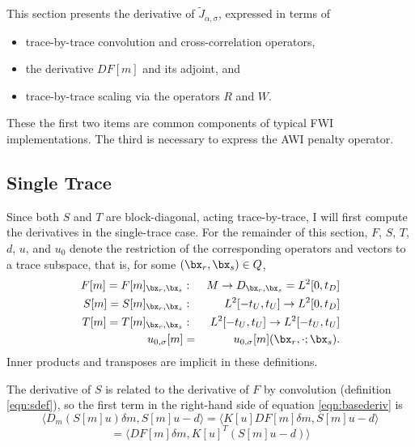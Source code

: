 This section presents the derivative of $\tilde{J}_{\alpha,\sigma}$, expressed in terms of
\begin{itemize}
  \item trace-by-trace convolution and cross-correlation operators,
  \item the derivative $DF[m]$ and its adjoint, and
  \item trace-by-trace scaling via the operators $R$ and $W$.
\end{itemize}
These the first two items are common components of typical FWI implementations. The
third is necessary to express the AWI penalty operator.

\subsection{Single Trace}

Since both $S$ and $T$ are block-diagonal, acting trace-by-trace, I
will first compute the derivatives in the single-trace case. For the
remainder of this section, $F$, $S$, $T$, $d$, $u$, and $u_0$ denote
the restriction of the corresponding operators and vectors to a trace subspace, that is, for some $(\bx_r,\bx_s) \in Q$,
\begin{eqnarray*}
  F[m] = F[m]_{\bx_r,\bx_s}&: & M \rightarrow D_{\bx_r,\bx_s} =
                 L^2[0,t_D] \\
  S[m] = S[m]_{\bx_r,\bx_s}&: & L^2[-t_U,t_U] \rightarrow L^2[0,t_D] \\
  T[m] = T[m]_{\bx_r,\bx_s}&: & L^2[-t_U,t_U] \rightarrow L^2[-t_U,t_U] \\
  u_{0,\sigma}[m] &=& u_{0,\sigma}[m](\bx_r,\cdot;\bx_s).
\end{eqnarray*}
Inner products and transposes are implicit in these definitions.

The derivative of $S$ is related to the derivative of $F$ by
convolution (definition \ref{eqn:sdef}), so the first term in the
right-hand side of equation \ref{eqn:basederiv} is
\[
  \langle D_m(S[m]u)\delta m, S[m]u-d \rangle = \langle
  K[u]DF[m]\delta m, S[m]u-d \rangle
\]
\begin{equation}
  \label{eqn:resderiv}
  = \langle DF[m]\delta m, K[u]^T(S[m]u-d) \rangle
\end{equation}

